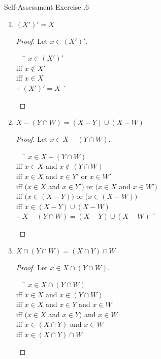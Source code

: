\documentclass[../notes.tex]{subfiles}
\begin{document}
			\begin{exercise}{Self-Assessment Exercise \thechapter.6}
				\begin{enumerate}[label=(\alph*), itemsep=0.5em]
					\item $(X')' = X$
						\begin{proof}
							Let $x \in (X')'$.
							\begin{tabbing}
								$\quad$ \= $x \in (X')'$\\
								iff \> $x \notin X'$\\
								iff \> $x \in X$\\
								$\therefore$ \> $(X')' = X$ \` \qedhere
							\end{tabbing}
						\end{proof}
					\item $X - (Y \cap W) = (X - Y) \cup (X - W)$
						\begin{proof}
							Let $x \in X - (Y \cap W)$.
							\begin{tabbing}
								$\quad$ \= $x \in X - (Y \cap W)$\\
								iff \> $x \in X$ and $x \notin (Y \cap W)$\\
								iff \> $x \in X$ and $x \in Y'$ or $x \in W'$\\
								iff \> $\bigl(x \in X$ and $x \in Y'\bigr)$ or $\bigl(x \in X$ and $x \in W'\bigr)$\\
								iff \> $\bigl(x \in (X - Y)\bigr)$ or $\bigl(x \in (X - W)\bigr)$\\
								iff \> $x \in (X - Y) \cup (X - W)$\\
								$\therefore$ \> $X - (Y \cap W) = (X - Y) \cup (X - W)$ \` \qedhere
							\end{tabbing}
						\end{proof}
					\item $X \cap (Y \cap W) = (X \cap Y) \cap W$
						\begin{proof}
							Let $x \in X \cap (Y \cap W)$.
							\begin{tabbing}
								$\quad$ \= $x \in X \cap (Y \cap W)$\\
								iff \> $x \in X$ and $x \in (Y \cap W)$\\
								iff \> $x \in X$ and $x \in Y$ and $x \in W$\\
								iff \> $(x \in X$ and $x \in Y)$ and $x \in W$\\
								iff \> $x \in (X \cap Y)$ and $x \in W$\\
								iff \> $x \in (X \cap Y) \cap W$\\

\end{tabbing}
\end{proof}
\end{enumerate}
\end{exercise}
\end{document}
